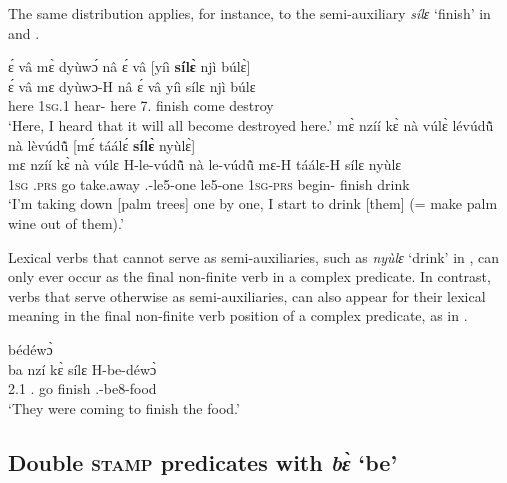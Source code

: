 \noindent The same distribution applies, for instance, to the semi-auxiliary {\itshape sílɛ} `finish' in  and .

\ea\label{3AUX3}
  \glll  ɛ́ vâ mɛ̀ dyùwɔ́ nâ ɛ́ vâ [yíì {\bfseries sílɛ̀} njì búlɛ̀] \\
        ɛ́ vâ mɛ dyùwɔ-H nâ ɛ́ vâ {\db}yíì sílɛ njì búlɛ \\
         {\LOC} here 1\textsc{sg}.{\PST}1 hear-{\R} {\COMP} {\LOC} here {\db}7.{\FUT} finish come destroy\\
    \trans `Here, I heard that it will all become destroyed here.'
\ex\label{silex3}
  \glll   mɛ̀ nzíí kɛ̀ nà vúlɛ̀ lévúdũ̂ nà lèvúdũ̂ [mɛ́ táálɛ́ {\bfseries sílɛ̀} nyùlɛ̀] \\
          mɛ nzíí kɛ̀ nà vúlɛ H-le-vúdũ̂ nà le-vúdũ̂ {\db}mɛ-H táálɛ-H sílɛ nyùlɛ \\
           1\textsc{sg} {\PROG}.\textsc{prs} go {\COM} take.away {\OBJ}.{\LINK}-le5-one {\COM} le5-one {\db}1\textsc{sg}-\textsc{prs} begin-{\R} finish drink\\
    \trans `I'm taking down [palm trees] one by one, I start to drink [them] (= make palm wine out of them).'
\z

\noindent Lexical verbs that cannot serve as semi-auxiliaries, such as {\itshape nyùlɛ} `drink' in , can only ever occur as the final non-finite verb in a complex predicate. In contrast, verbs that serve otherwise as semi-auxiliaries, can also appear for their lexical meaning in the final non-finite verb position of a complex predicate, as in .

\ea\label{silex33}
   bédéwɔ̀ \\
          {\db}ba nzí kɛ̀ sílɛ H-be-déwɔ̀ \\
        {\db}2.{\PST}1 {\PROG}.{\PST} go finish {\OBJ}.{\LINK}-be8-food\\
    \trans `They were coming to finish the food.'
\z

















\subsection{Double \textsc{stamp} predicates with {\itshape bɛ̀} `be'}
\label{sec:Compbe}

